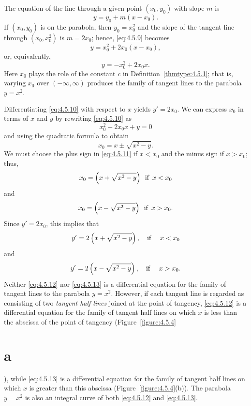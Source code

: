 \begin{examplesolution}
 The equation of the line through a given point $(x_{0},y_{0})$ with slope $m$ is
\begin{equation}
  \label{eq:4.5.9}y=y_{0}+m(x-x_{0}).
\end{equation}
If $(x_{0},y_{0})$ is on the parabola, then $y_{0}=x_{0}^{2}$ and the slope of the tangent line
through $(x_{0},x_{0}^{2})$ is $m=2x_{0}$; hence, \eqref{eq:4.5.9} becomes
\[
  y=x_{0}^{2}+2x_{0}(x-x_{0}),
\]
or, equivalently,
\begin{equation}
  \label{eq:4.5.10}y=-x_{0}^{2}+2x_{0}x.
\end{equation}
Here $x_{0}$ plays the role of the constant $c$ in Definition~\ref{thmtype:4.5.1}; that is, varying
$x_{0}$ over $(-\infty,\infty)$ produces the family of tangent lines to the parabola $y=x^{2}$.

Differentiating \eqref{eq:4.5.10} with respect to $x$ yields $y'=2x_{0}$. We can express $x_{0}$ in
terms of $x$ and $y$ by rewriting \eqref{eq:4.5.10} as
\[
  x_{0}^{2}-2x_{0}x+y=0
\]
and using the quadratic formula to obtain
\begin{equation}
  \label{eq:4.5.11}x_{0}=x\pm\sqrt{x^{2}-y}.
\end{equation}
We must choose the plus sign in \eqref{eq:4.5.11} if $x<x_{0}$ and the minus sign if $x>x_{0}$;
thus,
\[
  x_{0}=\left(x+\sqrt{x^{2}-y}\right)\mbox{\, if \,}x<x_{0}
\]
and
\[
  x_{0}=\left(x-\sqrt{x^{2}-y}\right)\mbox{\, if \,}x>x_{0}.
\]
Since $y'=2x_{0}$, this implies that
\begin{equation}
  \label{eq:4.5.12}y'=2\left(x+\sqrt{x^{2}-y}\right),\mbox{\quad if \quad}x<x_{0}
\end{equation}
and
\begin{equation}
  \label{eq:4.5.13}y'=2\left(x-\sqrt{x^{2}-y}\right),\mbox{\quad if \quad}x>x_{0}.
\end{equation}
Neither \eqref{eq:4.5.12} nor \eqref{eq:4.5.13} is a differential equation for the family of tangent
lines to the parabola $y=x^{2}$. However, if each tangent line is regarded as consisting of two
{\color{blue}\it tangent half lines\/} joined at the point of tangency, \eqref{eq:4.5.12} is a
differential equation for the family of tangent half lines on which $x$ is less than the abscissa of
the point of tangency (Figure~\ref{figure:4.5.4}\part{a}), while \eqref{eq:4.5.13} is a differential
equation for the family of tangent half lines on which $x$ is greater than this abscissa
(Figure~\ref{figure:4.5.4}(b)). The parabola $y=x^{2}$ is also an integral curve of both
\eqref{eq:4.5.12} and \eqref{eq:4.5.13}.


\end{examplesolution}
